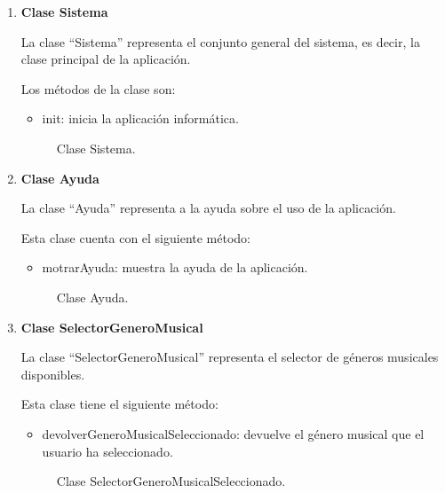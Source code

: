 \begin{enumerate}

  \item \textbf{Clase Sistema}

  La clase ``Sistema'' representa el conjunto general del sistema, es decir, la clase principal de la aplicación.

  Los métodos de la clase son:

  \begin{itemize}
      \item init: inicia la aplicación informática.
  \end{itemize}

  \begin{figure}[H]
    \centering
    
    \caption{Clase Sistema.}
  \end{figure}


  \item \textbf{Clase Ayuda}

  La clase ``Ayuda'' representa a la ayuda sobre el uso de la aplicación.

  Esta clase cuenta con el siguiente método:

  \begin{itemize}
      \item motrarAyuda: muestra la ayuda de la aplicación.
  \end{itemize}

  \begin{figure}[H]
    \centering
    
    \caption{Clase Ayuda.}
  \end{figure}

  \item \textbf{Clase SelectorGeneroMusical}

  La clase ``SelectorGeneroMusical'' representa el selector de géneros musicales disponibles.

  Esta clase tiene el siguiente método:

  \begin{itemize}
      \item devolverGeneroMusicalSeleccionado: devuelve el género musical que el usuario ha seleccionado.
  \end{itemize}

  \begin{figure}[H]
    \centering
    
    \caption{Clase SelectorGeneroMusicalSeleccionado.}
  \end{figure}



\end{enumerate}
